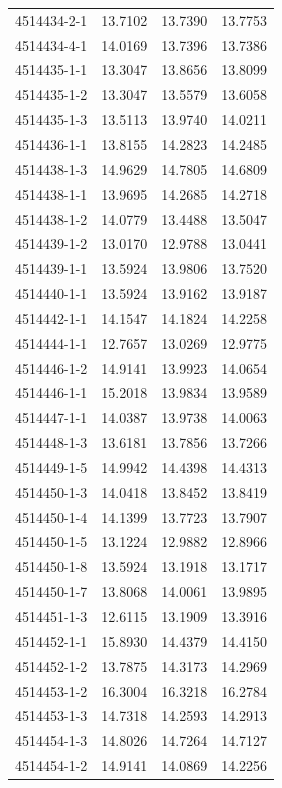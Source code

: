 \begin{longtable}{lrrr}
4514434-2-1 & 13.7102 & 13.7390 & 13.7753 \\
4514434-4-1 & 14.0169 & 13.7396 & 13.7386 \\
4514435-1-1 & 13.3047 & 13.8656 & 13.8099 \\
4514435-1-2 & 13.3047 & 13.5579 & 13.6058 \\
4514435-1-3 & 13.5113 & 13.9740 & 14.0211 \\
4514436-1-1 & 13.8155 & 14.2823 & 14.2485 \\
4514438-1-3 & 14.9629 & 14.7805 & 14.6809 \\
4514438-1-1 & 13.9695 & 14.2685 & 14.2718 \\
4514438-1-2 & 14.0779 & 13.4488 & 13.5047 \\
4514439-1-2 & 13.0170 & 12.9788 & 13.0441 \\
4514439-1-1 & 13.5924 & 13.9806 & 13.7520 \\
4514440-1-1 & 13.5924 & 13.9162 & 13.9187 \\
4514442-1-1 & 14.1547 & 14.1824 & 14.2258 \\
4514444-1-1 & 12.7657 & 13.0269 & 12.9775 \\
4514446-1-2 & 14.9141 & 13.9923 & 14.0654 \\
4514446-1-1 & 15.2018 & 13.9834 & 13.9589 \\
4514447-1-1 & 14.0387 & 13.9738 & 14.0063 \\
4514448-1-3 & 13.6181 & 13.7856 & 13.7266 \\
4514449-1-5 & 14.9942 & 14.4398 & 14.4313 \\
4514450-1-3 & 14.0418 & 13.8452 & 13.8419 \\
4514450-1-4 & 14.1399 & 13.7723 & 13.7907 \\
4514450-1-5 & 13.1224 & 12.9882 & 12.8966 \\
4514450-1-8 & 13.5924 & 13.1918 & 13.1717 \\
4514450-1-7 & 13.8068 & 14.0061 & 13.9895 \\
4514451-1-3 & 12.6115 & 13.1909 & 13.3916 \\
4514452-1-1 & 15.8930 & 14.4379 & 14.4150 \\
4514452-1-2 & 13.7875 & 14.3173 & 14.2969 \\
4514453-1-2 & 16.3004 & 16.3218 & 16.2784 \\
4514453-1-3 & 14.7318 & 14.2593 & 14.2913 \\
4514454-1-3 & 14.8026 & 14.7264 & 14.7127 \\
4514454-1-2 & 14.9141 & 14.0869 & 14.2256 \\

\end{longtable}
